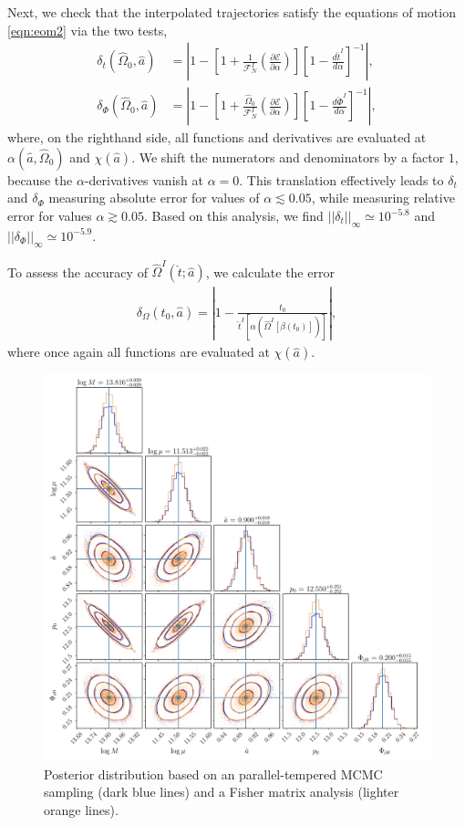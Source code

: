 \documentclass[%
 reprint,
 nofootinbib,
 amsmath,amssymb,
 aps,
 prd,
]{revtex4-2}
\begin{document}
Next, we check that the interpolated trajectories satisfy the equations of motion \eqref{eqn:eom2} via the two tests,
\begin{align}
    \delta_{t}(\hat{\Omega}_0, \hat{a}) &= \left| 1 - \left[1 + \frac{1}{\mathcal{F}^I_N}\left(\frac{\partial\mathcal{E}}{\partial\alpha} \right)\right]\left[1 - \frac{d\check{t}^I}{d\alpha}\right]^{-1}\right|,
    \\
    \delta_{\Phi}(\hat{\Omega}_0, \hat{a}) &= \left| 1 -  \left[1 + \frac{\hat{\Omega}_0}{\mathcal{F}^I_N}\left(\frac{\partial\mathcal{E}}{\partial\alpha} \right)\right]\left[1 -\frac{d\check{\Phi}^I}{d{\alpha}} \right]^{-1}\right|,
\end{align}
where, on the righthand side, all functions and derivatives are evaluated at $\alpha(\hat{a},\hat{\Omega}_0)$ and $\chi(\hat{a})$. We shift the numerators and denominators by a factor $1$, because the $\alpha$-derivatives vanish at $\alpha = 0$. This translation effectively leads to $\delta_t$ and $\delta_\Phi$ measuring absolute error for values of $\alpha \lesssim 0.05$, while measuring relative error for values $\alpha \gtrsim 0.05$. Based on this analysis, we find $||\delta_t||_\infty \simeq 10^{-5.8}$ and $||\delta_\Phi||_\infty \simeq 10^{-5.9}$.

To assess the accuracy of $\hat{\Omega}^I(\check{t};\hat{a})$, we calculate the error
\begin{align}
    \delta_{\Omega}(t_0, \hat{a}) = \left| 1- \frac{t_0}{\check{t}^I[\alpha(\hat{\Omega}^I[\beta(t_0)])]} \right|,
\end{align}
where once again all functions are evaluated at $\chi(\hat{a})$.

\begin{figure}[!htp]
    \centering
    \includegraphics[width=0.98\linewidth]{figures/mcmc.pdf}
    \caption{Posterior distribution based on an parallel-tempered MCMC sampling (dark blue lines) and a Fisher matrix analysis (lighter orange lines).}
    \label{fig:mcmcOverlay}
\end{figure}
\end{document}
